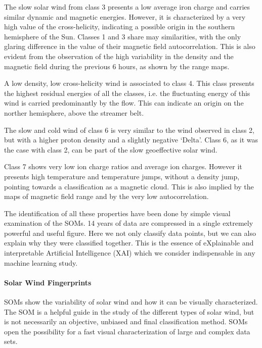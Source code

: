 The slow solar wind from class 3 presents a low average iron charge and carries similar dynamic and magnetic energies. However, it is characterized by a very high value of the cross-helicity, indicating a possible origin in the southern hemisphere of the Sun. Classes 1 and 3 share may similarities, with the only glaring difference in the value of their magnetic field autocorrelation. This is also evident from the observation of the high variability in the density and the magnetic field during the previous 6 hours, as shown by the range maps.

A low density, low cross-helicity wind is associated to class 4. This class presents the highest residual energies of all the classes, i.e. the fluctuating energy of this wind is carried predominantly by the flow. This can indicate an origin on the norther hemisphere, above the streamer belt.

The slow and cold wind of class 6 is very similar to the wind observed in class 2, but with a higher proton density and a slightly negative `Delta'. Class 6, as it was the case with class 2, can be part of the slow geoeffective solar wind.

Class 7 shows very low ion charge ratios and average ion charges. However it presents high temperature and temperature jumps, without a density jump, pointing towards a classification as a magnetic cloud. This is also implied by the maps of magnetic field range and by the very low autocorrelation.

The identification of all these properties have been done by simple visual examination of the SOMs. 14 years of data are compressed in a single extremely powerful and useful figure. Here we not only classify data points, but we can also explain why they were classified together. This is the essence of eXplainable and interpretable Artificial Intelligence (XAI) which we consider indispensable in any machine learning study. 

\paragraph{Solar Wind Fingerprints}

SOMs show the variability of solar wind and how it can be visually characterized. The SOM is a helpful guide in the study of the different types of solar wind, but is not necessarily an objective, unbiased and final classification method. SOMs open the possibility for a fast visual characterization of large and complex data sets.

